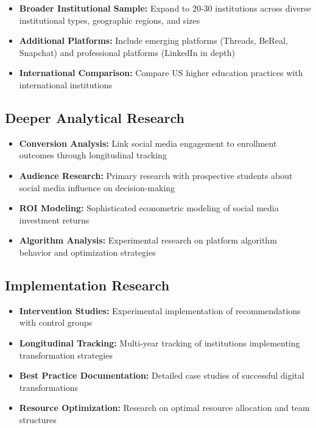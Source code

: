 \documentclass[12pt]{report}
\begin{document}
\begin{itemize}
\item \textbf{Broader Institutional Sample:} Expand to 20-30 institutions across diverse institutional types, geographic regions, and sizes
\item \textbf{Additional Platforms:} Include emerging platforms (Threads, BeReal, Snapchat) and professional platforms (LinkedIn in depth)
\item \textbf{International Comparison:} Compare US higher education practices with international institutions
\end{itemize}

\subsection{Deeper Analytical Research}

\begin{itemize}
\item \textbf{Conversion Analysis:} Link social media engagement to enrollment outcomes through longitudinal tracking
\item \textbf{Audience Research:} Primary research with prospective students about social media influence on decision-making
\item \textbf{ROI Modeling:} Sophisticated econometric modeling of social media investment returns
\item \textbf{Algorithm Analysis:} Experimental research on platform algorithm behavior and optimization strategies
\end{itemize}

\subsection{Implementation Research}

\begin{itemize}
\item \textbf{Intervention Studies:} Experimental implementation of recommendations with control groups
\item \textbf{Longitudinal Tracking:} Multi-year tracking of institutions implementing transformation strategies
\item \textbf{Best Practice Documentation:} Detailed case studies of successful digital transformations
\item \textbf{Resource Optimization:} Research on optimal resource allocation and team structures
\end{itemize}
\end{document}
